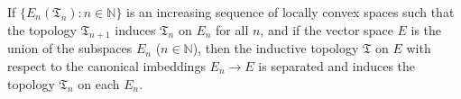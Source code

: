 If $\{E_n(\mathfrak{T}_n): n \in \mathbb{N}\}$ is an increasing sequence of locally convex spaces such that the topology $\mathfrak{T}_{n+1}$ induces $\mathfrak{T}_n$ on $E_n$ for all $n$, and if the vector space $E$ is the union of the subspaces $E_n$ ($n \in \mathbb{N}$), then the inductive topology $\mathfrak{T}$ on $E$ with respect to the canonical imbeddings $E_n \rightarrow E$ is separated and induces the topology $\mathfrak{T}_n$ on each $E_n$.
